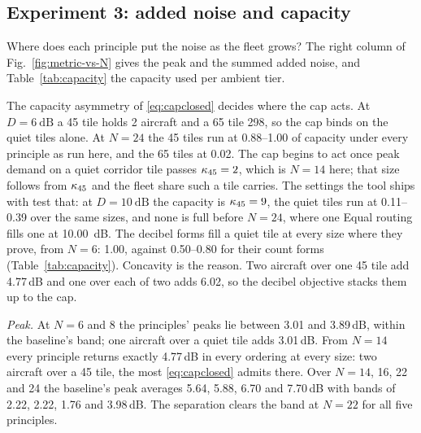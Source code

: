 \subsection{Experiment 3: added noise and capacity}
\label{sec:noise}

Where does each principle put the noise as the fleet grows? The right column of
Fig.~\ref{fig:metric-vs-N} gives the peak and the summed added noise, and
Table~\ref{tab:capacity} the capacity used per ambient tier.

The capacity asymmetry of \eqref{eq:capclosed} decides where the cap acts. At
$D=\SI{6}{\dB}$ a \SI{45}{\dBA} tile holds 2 aircraft and a \SI{65}{\dBA} tile 298, so
the cap binds on the quiet tiles alone. At $N=24$ the \SI{45}{\dBA} tiles run at
0.88--1.00 of capacity under every principle as run here, and the \SI{65}{\dBA} tiles at
0.02. The cap begins to act once peak demand on a quiet corridor tile passes
$\kappa_{45}=2$, which is $N=14$ here; that size follows from $\kappa_{45}$ and the fleet
share such a tile carries. The settings the tool ships with test that: at
$D=\SI{10}{\dB}$ the capacity is $\kappa_{45}=9$, the quiet tiles run at 0.11--0.39 over
the same sizes, and none is full before $N=24$, where one Equal routing fills one at
\SI{10.00}{\dB}. The decibel forms fill a quiet tile at every size where they prove, from
$N=6$: 1.00, against 0.50--0.80 for their count forms (Table~\ref{tab:capacity}).
Concavity is the reason. Two aircraft over one \SI{45}{\dBA} tile add 4.77\,dB and one
over each of two adds 6.02, so the decibel objective stacks them up to the cap.



\emph{Peak.} At $N=6$ and 8 the principles' peaks lie between 3.01 and 3.89\,dB, within
the baseline's band; one aircraft over a quiet tile adds 3.01\,dB. From $N=14$ every
principle returns exactly 4.77\,dB in every ordering at every size: two aircraft over a
\SI{45}{\dBA} tile, the most \eqref{eq:capclosed} admits there. Over $N=14$, 16, 22 and 24
the baseline's peak averages 5.64, 5.88, 6.70 and 7.70\,dB with bands of 2.22, 2.22, 1.76
and 3.98\,dB. The separation clears the band at $N=22$ for all five principles.

